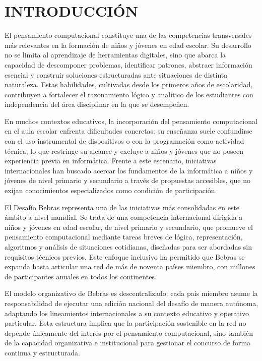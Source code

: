 \section{INTRODUCCIÓN}

El pensamiento computacional constituye una de las competencias transversales más relevantes en la formación de niños y jóvenes en edad escolar. Su desarrollo no se limita al aprendizaje de herramientas digitales, sino que abarca la capacidad de descomponer problemas, identificar patrones, abstraer información esencial y 
construir soluciones estructuradas ante situaciones de distinta naturaleza. Estas habilidades, cultivadas desde los primeros años de escolaridad, contribuyen a fortalecer el razonamiento lógico y analítico de los estudiantes con independencia del área disciplinar en la que se desempeñen.

En muchos contextos educativos, la incorporación del pensamiento computacional en el aula escolar enfrenta dificultades concretas: su enseñanza suele confundirse con el uso instrumental de dispositivos o con la programación como actividad técnica, lo que restringe su alcance y excluye a niños y jóvenes que no poseen experiencia previa en informática.
Frente a este escenario, iniciativas internacionales han buscado acercar los fundamentos de la informática a niños y jóvenes de nivel primario y secundario a través de propuestas accesibles, que no exijan conocimientos especializados como condición de participación.

El Desafío Bebras representa una de las iniciativas más consolidadas en este ámbito a nivel mundial. Se trata de una competencia internacional dirigida a niños y jóvenes en edad escolar, de nivel primario y secundario, que promueve el pensamiento computacional mediante tareas breves de lógica, representación, algoritmos y análisis de situaciones cotidianas, diseñadas para ser abordadas sin requisitos técnicos previos. Este enfoque inclusivo
ha permitido que Bebras se expanda hasta articular una red de más de noventa países miembro, con millones de participantes anuales en todos los continentes.

El modelo organizativo de Bebras es descentralizado: cada país miembro asume la responsabilidad de ejecutar una edición nacional del desafío de manera autónoma, adaptando los lineamientos internacionales a su contexto educativo y operativo particular. Esta estructura implica que la participación sostenible en la red no 
depende únicamente del interés por el pensamiento computacional, sino también de la capacidad organizativa e institucional para gestionar el concurso de forma continua y estructurada.

